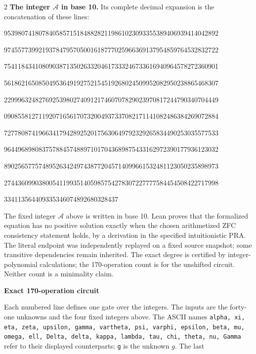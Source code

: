 \documentclass[10pt]{article}
\begin{document}
\begin{multicols}{2}
\textbf{The integer $\mathcal A$ in base 10.}
Its complete decimal expansion is the concatenation of these lines:\par
\begingroup\fontsize{7.7}{8.2}\selectfont{}\par
95398074180784058571518488282119861023093355389406939414042892\par
97455773992193784795705001618777025966369137954859764532832722\par
75411843410809038713502633204617333246733616940964578272360901\par
56186216508504953649192752154519268024509952082950238865468307\par
22999632482769253980274091217460707829023970817244790340704449\par
09085581271192071656170732004937337082171141082486384269072884\par
72778087419663417942892520175630649792329265834490253035577533\par
96449689808375788457488971017043689875433162972390177936123032\par
89025657757489526342497438772045714099661532481123050235898973\par
27443609903800541199351405985754278307227777584454508422717998\par
334113564409335346074892680328437\par
\endgroup
\normalfont\fontsize{7.7}{8.2}\selectfont
The fixed integer $\mathcal A$ above is written in base 10. Lean proves that the formalized equation has no positive solution exactly
when the chosen arithmetized ZFC consistency statement holds, by a derivation
in the specified intuitionistic PRA. The literal endpoint was independently
replayed on a fixed source snapshot; some transitive dependencies remain
inherited. The exact degree is certified by integer-polynomial calculations;
the 170-operation count is for the unshifted circuit. Neither count is a
minimality claim.
\end{multicols}
\clearpage
\begin{center}{\large\bfseries Exact 170-operation circuit}\end{center}
Each numbered line defines one gate over the integers. The inputs are the
forty-one unknowns and the four fixed integers above. The ASCII names
\texttt{alpha, xi, eta, zeta, upsilon, gamma, vartheta, psi, varphi, epsilon, beta, mu, omega, ell, Delta, delta, kappa, lambda, tau, chi, theta, nu, Gamma}
refer to their displayed counterparts; \texttt{g} is the unknown $g$. The last
\end{document}
